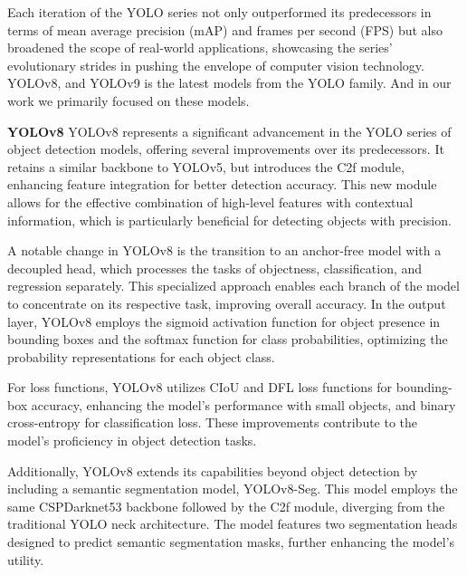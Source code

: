 Each iteration of the YOLO series not only outperformed its predecessors in terms of mean average precision (mAP) and frames per second (FPS) but also broadened the scope of real-world applications, showcasing the series' evolutionary strides in pushing the envelope of computer vision technology. YOLOv8, and YOLOv9 is the latest models from the YOLO family. And in our work we primarily focused on these models.



\textbf{YOLOv8} \cite{ultralyticsYOLOv8} YOLOv8 represents a significant advancement in the YOLO series of object detection models, offering several improvements over its predecessors. It retains a similar backbone to YOLOv5, but introduces the C2f module, enhancing feature integration for better detection accuracy. This new module allows for the effective combination of high-level features with contextual information, which is particularly beneficial for detecting objects with precision.

A notable change in YOLOv8 is the transition to an anchor-free model with a decoupled head, which processes the tasks of objectness, classification, and regression separately. This specialized approach enables each branch of the model to concentrate on its respective task, improving overall accuracy. In the output layer, YOLOv8 employs the sigmoid activation function for object presence in bounding boxes and the softmax function for class probabilities, optimizing the probability representations for each object class.

For loss functions, YOLOv8 utilizes CIoU and DFL loss functions for bounding-box accuracy, enhancing the model's performance with small objects, and binary cross-entropy for classification loss. These improvements contribute to the model's proficiency in object detection tasks.

Additionally, YOLOv8 extends its capabilities beyond object detection by including a semantic segmentation model, YOLOv8-Seg. This model employs the same CSPDarknet53 backbone followed by the C2f module, diverging from the traditional YOLO neck architecture. The model features two segmentation heads designed to predict semantic segmentation masks, further enhancing the model's utility.




